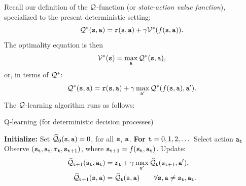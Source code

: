 Recall our definition of the $\mathcal{Q}$-function (or {\em state-action
value function}), specialized to the present deterministic setting:
$$
\mathcal{Q}^*({\tt s},{\tt a})={\tt r}({\tt s},{\tt a})+\gamma
\mathcal{V}^*(f({\tt s},{\tt a})).
$$
The optimality equation is then
$$
\mathcal{V}^*({\tt s}) = \max_{\tt a} \mathcal{Q}^*({\tt s},{\tt a}),
$$
or, in terms of $\mathcal{Q}^*$:
$$
\mathcal{Q}^*({\tt s},{\tt a})={\tt r}({\tt s},{\tt a})+\gamma
\max_{{\tt a}'}\mathcal{Q}^*(f({\tt s},{\tt a}),{\tt a}').
$$
The $\mathcal{Q}$-learning algorithm runs as follows:




\begin{algorithm}
\caption{Q-learning (for deterministic decision processes)}
\begin{algorithmic}[1]
\State \textbf{Initialize:} Set $\widehat{\mathcal{Q}}_0({\tt s},{\tt a}) = 0$, for all ${\tt s}$, ${\tt a}$.
\State \textbf{For} {${\tt t} = 0, 1, 2, \dots$}
    \State \quad Select action ${\tt a}_{\tt t}$
    \State \quad Observe $({\tt s}_{\tt t}, {\tt a}_{\tt t}, {\tt r}_{\tt t}, {\tt s}_{{\tt t}+1})$, where ${\tt s}_{{\tt t}+1} = f({\tt s}_{\tt t}, {\tt a}_{\tt t})$.
    \State \quad Update:
    \begin{equation*}
    \begin{split}
    \widehat{\mathcal{Q}}_{{\tt t}+1}({\tt s}_{\tt t}, {\tt a}_{\tt t}) &= {\tt r}_{\tt t} + \gamma \max_{{\tt a}'} \widehat{\mathcal{Q}}_{\tt t}({\tt s}_{{\tt t}+1}, {\tt a}'),
    \\
    \widehat{\mathcal{Q}}_{{\tt t}+1}({\tt s}, {\tt a}) &= \widehat{\mathcal{Q}}_{{\tt t}}({\tt s}, {\tt a}) \qquad \forall {\tt s}, {\tt a} \neq {\tt s}_{\tt t}, {\tt a}_{\tt t}.
    \end{split}
    \end{equation*}
\end{algorithmic}
\end{algorithm}

